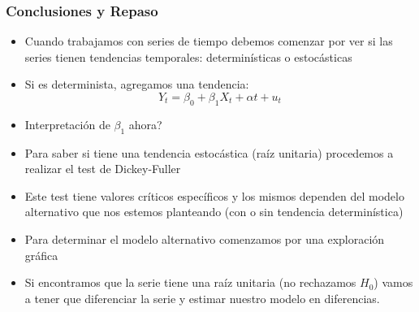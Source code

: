 \documentclass{beamer}
\begin{document}
\begin{frame}[shrink=10]
\frametitle{Conclusiones y Repaso}

\begin{itemize}
    \item Cuando trabajamos con series de tiempo debemos comenzar por ver si las series tienen tendencias temporales: determin\'isticas o estoc\'asticas
    \item Si es determinista, agregamos una tendencia:
    \[
    Y_t = \beta_0 + \beta_1 X_t + \alpha t + u_t
    \]
    \item Interpretaci\'on de $\beta_1$ ahora?
    \item Para saber si tiene una tendencia estoc\'astica (ra\'iz unitaria) procedemos a realizar el test de Dickey-Fuller
    \item Este test tiene valores cr\'iticos espec\'ificos y los mismos dependen del modelo alternativo que nos estemos planteando (con o sin tendencia determin\'istica)
    \item Para determinar el modelo alternativo comenzamos por una exploraci\'on gr\'afica
    \item Si encontramos que la serie tiene una ra\'iz unitaria (no rechazamos $H_0$) vamos a tener que diferenciar la serie y estimar nuestro modelo en diferencias.
\end{itemize}

\end{frame}
\end{document}

